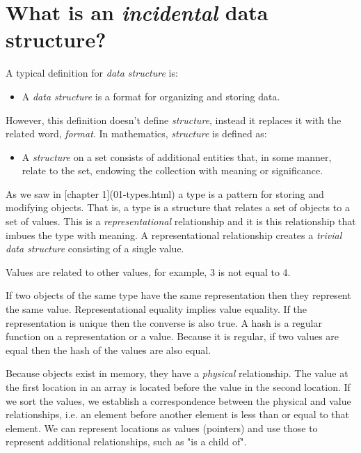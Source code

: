 \section{What is an \textit{incidental} data structure?}

A typical definition for \textit{data structure} is:

\begin{itemize}
\item A \textit{data structure} is a format for organizing and storing data. 
\end{itemize}

However, this definition doesn't define \textit{structure}, instead it replaces it with the related word, \textit{format}. In mathematics, \textit{structure} is defined as:

\begin{itemize}
\item A \textit{structure} on a set consists of additional entities that, in some manner, relate to the set, endowing the collection with meaning or significance. 
\end{itemize}


As we saw in [chapter 1](01-types.html) a type is a pattern for storing and modifying objects. That is, a type is a structure that relates a set of objects to a set of values. This is a \textit{representational} relationship and it is this relationship that imbues the type with meaning. A representational relationship creates a \textit{trivial data structure} consisting of a single value.

Values are related to other values, for example, 3 is not equal to 4.

If two objects of the same type have the same representation then they represent the same value. Representational equality implies value equality. If the representation is unique then the converse is also true. A hash is a regular function on a representation or a value. Because it is regular, if two values are equal then the hash of the values are also equal.

Because objects exist in memory, they have a \textit{physical} relationship. The value at the first location in an array is located before the value in the second location. If we sort the values, we establish a correspondence between the physical and value relationships, i.e. an element before another element is less than or equal to that element. We can represent locations as values (pointers) and use those to represent additional relationships, such as "is a child of".

